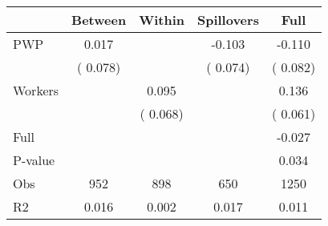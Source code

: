 
\begin{tabular}{l*{4}{c}}\hline&\multicolumn{1}{c}{Between}&\multicolumn{1}{c}{Within}&\multicolumn{1}{c}{Spillovers}&\multicolumn{1}{c}{Full}\\ \hline
 PWP           &              0.017      &                                               &       -0.103 &        -0.110                            \\ 
                               &        (       0.078)           &                                       &       (       0.074)     &      (       0.082)                                           \\ 
 Workers       &                                               &        0.095    &                                &             0.136                            \\ 
                               &                                               & (       0.068)                  &                                        &      (       0.061)                                           \\ 
\hline                                                                                                                                                                                                                                            
 Full                  &                                               &                                               &                                        &            -0.027                                     \\ 
 P-value               &                                               &                                               &                                        &             0.034                                           \\ 
 Obs                   &               952               &       898                       &       650                &              1250                                               \\ 
 R2                    &                      0.016              &              0.002                      &              0.017               &                     0.011                                              \\ 
\hline \end{tabular}                                                                                                                                                                                                              